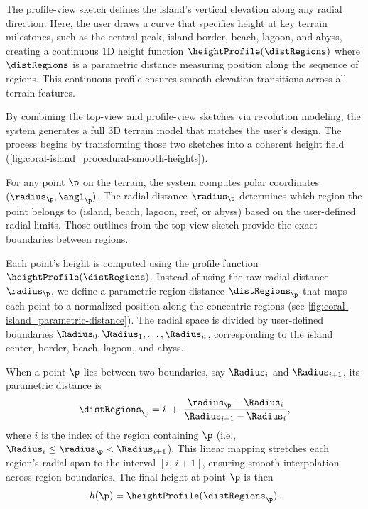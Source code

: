 \documentclass{egpubl}
\begin{document}
The profile-view sketch defines the island's vertical elevation along any radial direction. Here, the user draws a curve that specifies height at key terrain milestones, such as the central peak, island border, beach, lagoon, and abyss, creating a continuous 1D height function $\heightProfile(\distRegions)$ where $\distRegions$ is a parametric distance measuring position along the sequence of regions. This continuous profile ensures smooth elevation transitions across all terrain features.


By combining the top-view and profile-view sketches via revolution modeling, the system generates a full 3D terrain model that matches the user's design. The process begins by transforming those two sketches into a coherent height field (\cref{fig:coral-island_procedural-smooth-heights}).

For any point $\p$ on the terrain, the system computes polar coordinates $(\radius_\p, \angl_\p)$. The radial distance $\radius_\p$ determines which region the point belongs to (island, beach, lagoon, reef, or abyss) based on the user-defined radial limits. Those outlines from the top-view sketch provide the exact boundaries between regions.

Each point's height is computed using the profile function $\heightProfile(\distRegions)$. Instead of using the raw radial distance $\radius_\p$, we define a parametric region distance $\distRegions_\p$ that maps each point to a normalized position along the concentric regions (see \cref{fig:coral-island_parametric-distance}). The radial space is divided by user-defined boundaries $\Radius_0, \Radius_1, \dots, \Radius_n$, corresponding to the island center, border, beach, lagoon, and abyss.


When a point $\p$ lies between two boundaries, say $\Radius_{i}$ and $\Radius_{i+1}$, its parametric distance is
\begin{align}
    \distRegions_\p = i \;+\; \frac{\radius_\p - \Radius_{i}}{\Radius_{i + 1} - \Radius_{i}},
\end{align}
where $i$ is the index of the region containing $\p$ (i.e., $\Radius_i \le \radius_\p < \Radius_{i+1}$). This linear mapping stretches each region's radial span to the interval $[i,\,i+1]$, ensuring smooth interpolation across region boundaries. The final height at point $\p$ is then
\begin{align}
    h(\p) = \heightProfile(\distRegions_\p).
\end{align}
\end{document}
